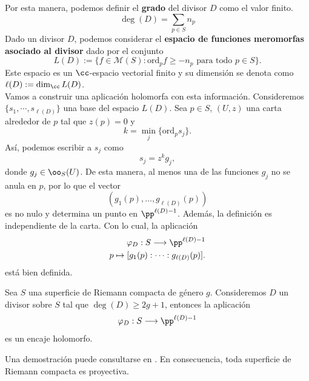    	Por esta manera, podemos definir el \textbf{grado} del divisor $D$ como el valor finito.
   	\begin{equation*}
   		\deg(D)=\sum_{p\in S} n_p
   	\end{equation*}
   	Dado un divisor $D$, podemos considerar el \textbf{espacio de funciones meromorfas asociado al divisor} dado por el conjunto
   	\begin{equation*}
   		L(D):=\{f\in\mathscr{M}(S):\mathrm{ord}_{p}f\geq -n_p\text{ para todo }p\in S\}.
   	\end{equation*}
   	Este espacio es un $\cc$-espacio vectorial finito y su dimensión se denota como $\ell(D):=\dim_{\cc}L(D)$.\\
   	Vamos a construir una aplicación holomorfa con esta información. Consideremos $\{s_1,\cdots, s_{\ell(D)}\}$ una base del espacio $L(D)$. Sea $p\in S$, $(U,z)$ una carta alrededor de $p$ tal que $z(p)=0$ y
   	\begin{equation*}
   		k=\min_j\{\mathrm{ord}_ps_j\}.
   	\end{equation*}
   	Así, podemos escribir a $s_j$ como
   	\begin{equation*}
   		s_j=z^kg_j,
   	\end{equation*}
   	donde $g_j\in\oo_S(U)$. De esta manera, al menos una de las funciones $g_j$ no se anula en $p$, por lo que el vector
   	\begin{equation*}
   		(g_1(p),\dots,g_{\ell(D)}(p))
   	\end{equation*}
   	es no nulo y determina un punto en $\pp^{\ell(D)-1}$. Además, la definición es independiente de la carta. Con lo cual, la aplicación
   	\begin{align*}
   		\varphi_D:S\longrightarrow \pp^{\ell(D)-1}\\
   		p\mapsto[g_1(p):\cdots:g_{\ell(D)}(p)].
   	\end{align*}
   	está bien definida.
   	
   	\begin{theorem}\label{encajedesuperficies}
   		Sea $S$ una superficie de Riemann compacta de género $g$. Consideremos $D$ un divisor sobre $S$ tal que $\deg(D)\geq 2g+1$, entonces la aplicación
   		\begin{equation*}
   			\varphi_D:S\longrightarrow \pp^{\ell(D)-1}
   		\end{equation*}
   		es un encaje holomorfo.
   	\end{theorem}
   	Una demostración puede consultarse en \parencite[Teo.~5.111]{zaldrimann}. En consecuencia, toda superficie de Riemann compacta es proyectiva.
	
